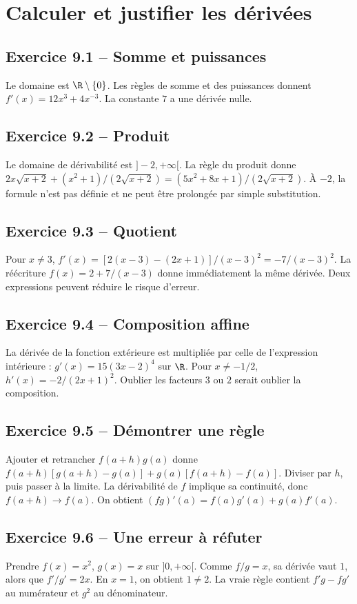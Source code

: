 \chapter{Calculer et justifier les dérivées}
\section*{Exercice 9.1 -- Somme et puissances}
Le domaine est $\R\setminus\{0\}$. Les règles de somme et des puissances donnent $f'(x)=12x^3+4x^{-3}$. La constante $7$ a une dérivée nulle.

\section*{Exercice 9.2 -- Produit}
Le domaine de dérivabilité est $]-2,+\infty[$. La règle du produit donne $2x\sqrt{x+2}+(x^2+1)/(2\sqrt{x+2})=(5x^2+8x+1)/(2\sqrt{x+2})$. À $-2$, la formule n'est pas définie et ne peut être prolongée par simple substitution.

\section*{Exercice 9.3 -- Quotient}
Pour $x\ne3$, $f'(x)=[2(x-3)-(2x+1)]/(x-3)^2=-7/(x-3)^2$. La réécriture $f(x)=2+7/(x-3)$ donne immédiatement la même dérivée. Deux expressions peuvent réduire le risque d'erreur.

\section*{Exercice 9.4 -- Composition affine}
La dérivée de la fonction extérieure est multipliée par celle de l'expression intérieure : $g'(x)=15(3x-2)^4$ sur $\R$. Pour $x\ne-1/2$, $h'(x)=-2/(2x+1)^2$. Oublier les facteurs $3$ ou $2$ serait oublier la composition.

\section*{Exercice 9.5 -- Démontrer une règle}
Ajouter et retrancher $f(a+h)g(a)$ donne $f(a+h)[g(a+h)-g(a)]+g(a)[f(a+h)-f(a)]$. Diviser par $h$, puis passer à la limite. La dérivabilité de $f$ implique sa continuité, donc $f(a+h)\to f(a)$. On obtient $(fg)'(a)=f(a)g'(a)+g(a)f'(a)$.

\section*{Exercice 9.6 -- Une erreur à réfuter}
Prendre $f(x)=x^2$, $g(x)=x$ sur $]0,+\infty[$. Comme $f/g=x$, sa dérivée vaut $1$, alors que $f'/g'=2x$. En $x=1$, on obtient $1\ne2$. La vraie règle contient $f'g-fg'$ au numérateur et $g^2$ au dénominateur.
